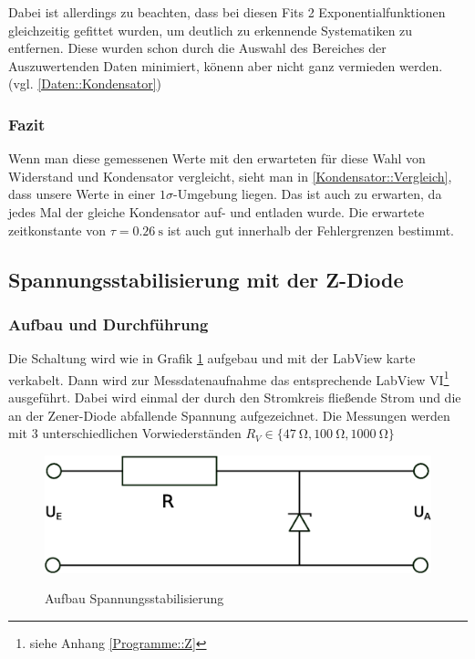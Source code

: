 \documentclass[12pt,twoside,a4paper]{scrartcl}
\begin{document}
			Dabei ist allerdings zu beachten, dass bei diesen Fits 2 Exponentialfunktionen gleichzeitig gefittet wurden, um deutlich zu erkennende Systematiken zu entfernen. Diese wurden schon durch die Auswahl des Bereiches der Auszuwertenden Daten minimiert, könenn aber nicht ganz vermieden werden. (vgl. \ref{Daten::Kondensator})

			\subsubsection{Fazit}
				Wenn man diese gemessenen Werte mit den erwarteten für diese Wahl von Widerstand und Kondensator vergleicht, sieht man in \ref{Kondensator::Vergleich}, dass unsere Werte in einer $1 \sigma$-Umgebung liegen. Das ist auch zu erwarten, da jedes Mal der gleiche Kondensator auf- und entladen wurde.
				Die erwartete zeitkonstante von $\tau = \SI{0.26}{\second}$ ist auch gut innerhalb der Fehlergrenzen bestimmt.

	\subsection{Spannungsstabilisierung mit der Z-Diode}

		\subsubsection{Aufbau und Durchführung}

			Die Schaltung wird wie in Grafik \ref{Aufbau::Z} aufgebau und mit der LabView karte verkabelt. Dann wird zur Messdatenaufnahme das entsprechende LabView VI\footnote{siehe Anhang \ref{Programme::Z}} ausgeführt. Dabei wird einmal der durch den Stromkreis fließende Strom und die an der Zener-Diode abfallende Spannung aufgezeichnet. Die Messungen werden mit 3 unterschiedlichen Vorwiederständen $R_V \in \{ \SI{47}{\ohm}, \SI{100}{\ohm}, \SI{1000}{\ohm} \}$

			\begin{figure}[H]
				\centering

				\includegraphics[width = 0.8 \textwidth]{Pictures/zener}
				\label{Aufbau::Z}
				\caption{Aufbau Spannungsstabilisierung}
			\end{figure}
\end{document}
